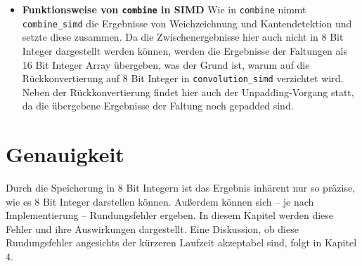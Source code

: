 \documentclass[course=erap]{aspdoc}
\begin{document}
\begin{itemize}
\begin{figure}[!ht]
\begin{minipage}[t]{.5\linewidth}
    \caption{Graustufenbild nach Padding}
    \label{fig:matrix_nach_padding}
    \end{minipage}
\end{figure}
\newline
Um die zwei Probleme zu lösen, wird das Graustufenbild außenrum mit Nullen gepaddet und das gepaddete Bild hat eine Größe von $(x+2)\cdot(y+2)$ (siehe Abbildung \ref{fig:matrix_nach_padding}).. So können alle Zugriffe außerhalb des Bildes vermieden werden (rotes Kästchen).. Die Berechnung von Pixeln am Rand sind auch korrekt, allerdings diese Padding-Pixel und somit für uns irrelevant sind (blaues Kästchen).. Während des Padding-Vorgangs können gleichzeitig die Pixel von 8 Bit zu 16 Bit integer konvertiert und gespeichert, um die Zwischenergebnisse korrekt darstellen zu können. Somit muss die Konvertierung nicht im Faltungsvorgang stattfinden.\newline
Wie in der Integer Implementierung werden Weichzeichnung und Kantendetektion in einem Durchgang berechnet. Anders als in \texttt{convolution} werden die Pixelwerte in \texttt{convolution\_simd} nicht in 8 Bit Integer zurückkonvertiert. Nach der Faltung müssen die Ergebnisse noch unpadded werden.

\item \textbf{Funktionsweise von \texttt{combine} in SIMD}\newline
Wie in \texttt{combine} nimmt \texttt{combine\_simd} die Ergebnisse von Weichzeichnung und Kantendetektion und setzte diese zusammen. Da die Zwischenergebnisse hier auch nicht in 8 Bit Integer dargestellt werden können, werden die Ergebnisse der Faltungen als 16 Bit Integer Array übergeben, was der Grund ist, warum auf die Rückkonvertierung auf 8 Bit Integer in \texttt{convolution\_simd} verzichtet wird. Neben der Rückkonvertierung findet hier auch der Unpadding-Vorgang statt, da die übergebene Ergebnisse der Faltung noch gepadded sind.
\end{itemize}
\section{Genauigkeit}
Durch die Speicherung in 8 Bit Integern ist das Ergebnis inhärent nur so präzise, wie es 8 Bit Integer darstellen können. Außerdem können sich – je nach Implementierung – Rundungsfehler ergeben. In diesem Kapitel werden diese Fehler und ihre Auswirkungen dargestellt. Eine Diskussion, ob diese Rundungsfehler angesichts der kürzeren Laufzeit akzeptabel sind, folgt in Kapitel 4.
\end{document}

